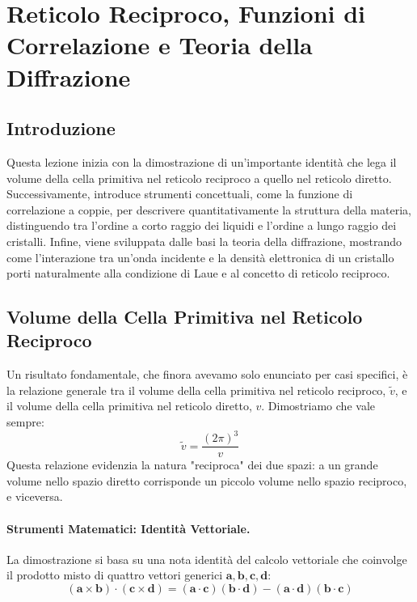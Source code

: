 
\section{Reticolo Reciproco, Funzioni di Correlazione e Teoria della Diffrazione}

\subsection{Introduzione}
Questa lezione inizia con la dimostrazione di un'importante identità che lega il volume della cella primitiva nel reticolo reciproco a quello nel reticolo diretto. Successivamente, introduce strumenti concettuali, come la funzione di correlazione a coppie, per descrivere quantitativamente la struttura della materia, distinguendo tra l'ordine a corto raggio dei liquidi e l'ordine a lungo raggio dei cristalli. Infine, viene sviluppata dalle basi la teoria della diffrazione, mostrando come l'interazione tra un'onda incidente e la densità elettronica di un cristallo porti naturalmente alla condizione di Laue e al concetto di reticolo reciproco.

\subsection{Volume della Cella Primitiva nel Reticolo Reciproco}

Un risultato fondamentale, che finora avevamo solo enunciato per casi specifici, è la relazione generale tra il volume della cella primitiva nel reticolo reciproco, \(\tilde{v}\), e il volume della cella primitiva nel reticolo diretto, \(v\). Dimostriamo che vale sempre:
\[ \tilde{v} = \frac{(2\pi)^3}{v} \]
Questa relazione evidenzia la natura "reciproca" dei due spazi: a un grande volume nello spazio diretto corrisponde un piccolo volume nello spazio reciproco, e viceversa.

\paragraph{Strumenti Matematici: Identità Vettoriale.}
La dimostrazione si basa su una nota identità del calcolo vettoriale che coinvolge il prodotto misto di quattro vettori generici \(\mathbf{a}, \mathbf{b}, \mathbf{c}, \mathbf{d}\):
\[ (\mathbf{a} \times \mathbf{b}) \cdot (\mathbf{c} \times \mathbf{d}) = (\mathbf{a} \cdot \mathbf{c})(\mathbf{b} \cdot \mathbf{d}) - (\mathbf{a} \cdot \mathbf{d})(\mathbf{b} \cdot \mathbf{c}) \]

